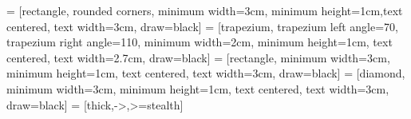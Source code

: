 \usepackage[utf8]{inputenc}
\usepackage[T1]{fontenc}
\usepackage[english]{babel}
\usepackage{titlesec}

\usepackage[style=apa, sorting = nyt, natbib]{biblatex}




%

\usepackage[hidelinks]{hyperref}

\setlength\parindent{0pt}
\setlength{\parskip}{0.5\baselineskip}

\newenvironment{rotatepage}%
    {\clearpage\pagebreak[4]\global\pdfpageattr\expandafter{\the\pdfpageattr/Rotate 90}}%
    {\clearpage\pagebreak[4]\global\pdfpageattr\expandafter{\the\pdfpageattr/Rotate 0}}%
    
\usepackage{graphicx}
\usepackage{tikz}
\usetikzlibrary{shapes.geometric, arrows}
 = [rectangle, rounded corners, minimum width=3cm, minimum height=1cm,text centered, text width=3cm, draw=black]%
 = [trapezium, trapezium left angle=70, trapezium right angle=110, minimum width=2cm, minimum height=1cm, text centered, text width=2.7cm, draw=black]%
 = [rectangle, minimum width=3cm, minimum height=1cm, text centered, text width=3cm, draw=black]%
 = [diamond, minimum width=3cm, minimum height=1cm, text centered, text width=3cm, draw=black]%
 = [thick,->,>=stealth]

\usepackage[font=small,labelfont=bf]{caption}

\usepackage{pdfpages}
\usepackage{multirow}
\usepackage{lscape}
\usepackage{rotating}

\usepackage{float}
\usepackage{mathtools}




  
\setcounter{secnumdepth}{1}
